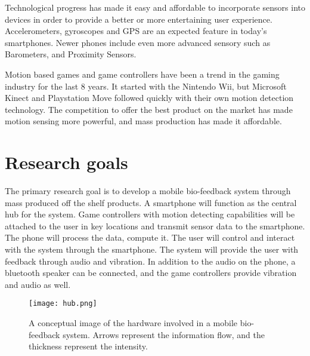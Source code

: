 Technological progress has made it easy and affordable to incorporate sensors into devices in order to provide a better or more entertaining user experience. Accelerometers, gyroscopes and GPS are an expected feature in today's smartphones. Newer phones include even more advanced sensory such as Barometers, and Proximity Sensors.


Motion based games and game controllers have been a trend in the gaming industry for the last 8 years. It started with the Nintendo Wii, but Microsoft Kinect and Playstation Move followed quickly with their own motion detection technology. The competition to offer the best product on the market has made motion sensing more powerful, and mass production has made it affordable.

\section{Research goals}
The primary research goal is to develop a mobile bio-feedback system through mass produced off the shelf products. A smartphone will function as the central hub for the system. Game controllers with motion detecting capabilities will be attached to the user in key locations and transmit sensor data to the smartphone. The phone will process the data, compute it. The user will control and interact with the system through the smartphone. The system will provide the user with feedback through audio and vibration. In addition to the audio on the phone, a bluetooth speaker can be connected, and the game controllers provide vibration and audio as well.

\begin{figure}[h!]
  \centering
    \texttt{[image: hub.png]}
    \caption{\footnotesize A conceptual image of the hardware involved in a mobile bio-feedback system. Arrows represent the information flow, and the thickness represent the intensity.}
\end{figure}

